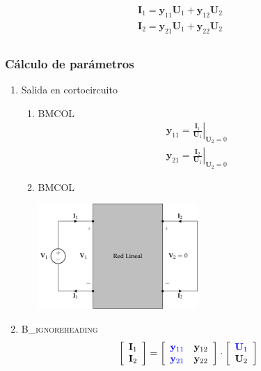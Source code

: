 \[
\begin{array}{l}
  \mathbf{I}_1 = \mathbf{y}_{11} \mathbf{U}_1 + \mathbf{y}_{12} \mathbf{U}_2\\
  \mathbf{I}_2 = \mathbf{y}_{21} \mathbf{U}_1 + \mathbf{y}_{22} \mathbf{U}_2\\
\end{array}
\]


\subsubsection{Cálculo de parámetros}
\label{sec:org003b72b}

\begin{enumerate}
\item Salida en cortocircuito
\label{sec:orgb1789af}

\begin{enumerate}
\item \hfill{}\textsc{BMCOL}
\label{sec:org0edf562}
\renewcommand{\arraystretch}{2}
\[
  \begin{array}{c}
    \mathbf{y}_{11} = \left.\frac{\mathbf{I}_1}{\mathbf{U}_1}\right\rvert_{\mathbf{U}_2 = 0} \\
    \mathbf{y}_{21} = \left.\frac{\mathbf{I}_2}{\mathbf{U}_1}\right\rvert_{\mathbf{U}_2 = 0}
  \end{array}
\]

\item \hfill{}\textsc{BMCOL}
\label{sec:org7c2d782}

\includegraphics[height=4cm]{../figs/parametrosY_entrada.pdf}

\end{enumerate}

\item \hfill{}\textsc{B\_ignoreheading}
\label{sec:orgce1c711}
\[
  \left[
    \begin{array}{c}
      \mathbf{I}_1\\
      \mathbf{I}_2
    \end{array}
  \right] =
  \left[
    \begin{array}{cc}
      \color{blue}{\mathbf{y}_{11}} & \mathbf{y}_{12}\\
      \color{blue}{\mathbf{y}_{21}} & \mathbf{y}_{22}
    \end{array}
  \right] \cdot
  \left[
    \begin{array}{c}
      \color{blue}{\mathbf{U}_1}\\
      \mathbf{U}_2
    \end{array}
  \right]
\]
\end{enumerate}


